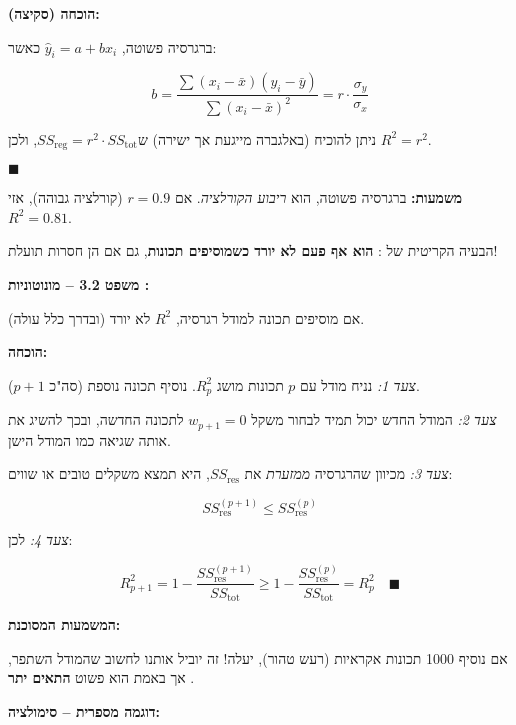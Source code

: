 \textbf{הוכחה (סקיצה):}

ברגרסיה פשוטה, $\hat{y}_i = a + bx_i$ כאשר:

\[
b = \frac{\sum (x_i - \bar{x})(y_i - \bar{y})}{\sum (x_i - \bar{x})^2} = r \cdot \frac{\sigma_y}{\sigma_x}
\]

ניתן להוכיח (באלגברה מייגעת אך ישירה) ש\en{-}$SS_{\text{reg}} = r^2 \cdot SS_{\text{tot}}$, ולכן $R^2 = r^2$.

$\blacksquare$

\textbf{משמעות:} ברגרסיה פשוטה, \Rsquared{} הוא \textit{ריבוע הקורלציה}. אם $r = \num{0.9}$ (קורלציה גבוהה), אזי $R^2 = \num{0.81}$.


הבעיה הקריטית של \Rsquared{}: \textbf{הוא אף פעם לא יורד כשמוסיפים תכונות}, גם אם הן חסרות תועלת!

\textbf{משפט \num{3.2} – מונוטוניות \Rsquared{}:}

אם מוסיפים תכונה למודל רגרסיה, $R^2$ לא יורד (ובדרך כלל עולה).

\textbf{הוכחה:}

\textit{צעד 1:} נניח מודל עם $p$ תכונות מושג $R^2_p$. נוסיף תכונה נוספת (סה"כ $p+1$).

\textit{צעד 2:} המודל החדש יכול תמיד לבחור משקל $w_{p+1} = \num{0}$ לתכונה החדשה, ובכך להשיג את אותה שגיאה כמו המודל הישן.

\textit{צעד 3:} מכיוון שהרגרסיה \textit{ממזערת} את $SS_{\text{res}}$, היא תמצא משקלים טובים או שווים:

\[
SS_{\text{res}}^{(p+1)} \leq SS_{\text{res}}^{(p)}
\]

\textit{צעד 4:} לכן:

\[
R^2_{p+1} = 1 - \frac{SS_{\text{res}}^{(p+1)}}{SS_{\text{tot}}} \geq 1 - \frac{SS_{\text{res}}^{(p)}}{SS_{\text{tot}}} = R^2_p \quad \blacksquare
\]

\textbf{המשמעות המסוכנת:}

אם נוסיף \num{1000} תכונות אקראיות (רעש טהור), \Rsquared{} יעלה! זה יוביל אותנו לחשוב שהמודל השתפר, אך באמת הוא פשוט \textbf{התאים יתר} .

\textbf{דוגמה מספרית – סימולציה:}

